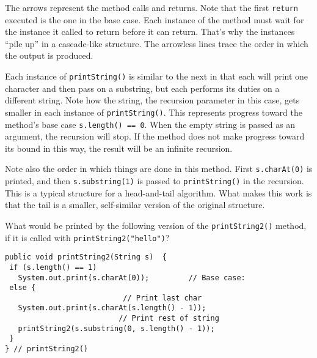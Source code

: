 \noindent The arrows represent the method calls and returns.  Note that the
first {\tt return} executed is the one in the base case.  Each
instance of the method must wait for the instance it called to return
before it can return.  That's why the instances ``pile up'' in a
cascade-like structure.  The arrowless lines trace the order in which
the output is produced.


Each instance of {\tt printString()} is similar to the next in that
each will print one character and then pass on a substring, but each
performs its duties on a different string.  Note how the string, the
recursion parameter in this case, gets smaller in each instance of
{\tt printString()}.   This
represents progress toward the method's base case {\tt s.length() ==
0}.  When the empty string is passed as an argument, the recursion
will stop.  If the method does not make progress toward its bound in
this way, the result will be an infinite recursion.



\noindent Note also the order in which things are done in this method.
First {\tt s.charAt(0)} is printed, and then {\tt s.substring(1)} is
passed to {\tt printString()} in the recursion.  This is a typical
structure for a head-and-tail algorithm. What makes this work is
that the tail is a smaller, self-similar version of the original
structure.


\pagebreak
{}
\begin{SSTUDY}

\item  What would be printed by the following 
version of the {\tt printString2()}
method, if it is called with {\tt printString2("hello")}?

\begin{jjjlisting}
\begin{lstlisting}
public void printString2(String s)  {
 if (s.length() == 1)
   System.out.print(s.charAt(0));         // Base case:
 else {
                           // Print last char
   System.out.print(s.charAt(s.length() - 1)); 
                          // Print rest of string
   printString2(s.substring(0, s.length() - 1));  
 }
} // printString2()
\end{lstlisting}
\end{jjjlisting}

\end{SSTUDY}

